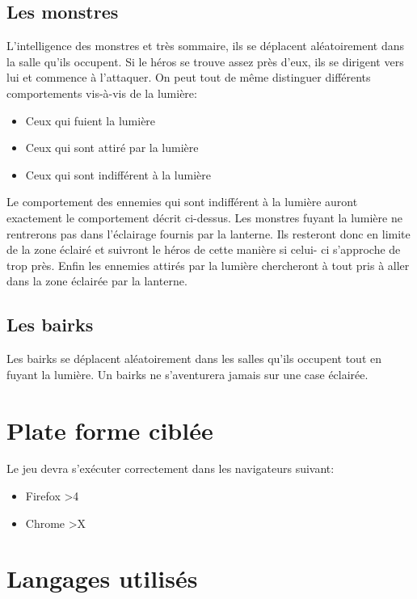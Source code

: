 \documentclass[a4paper, 11pt]{report}
\begin{document}
      \section{Les monstres}
        L'intelligence des monstres et très sommaire, ils se déplacent aléatoirement dans la salle qu'ils 
        occupent. Si le héros se trouve assez près d'eux, ils se dirigent vers lui et commence à l'attaquer.
        On peut tout de m\^eme distinguer différents comportements vis-à-vis de la lumière:
        \begin{itemize}
        \item{Ceux qui fuient la lumière}
        \item{Ceux qui sont attiré par la lumière}
        \item{Ceux qui sont indifférent à la lumière}
        \end{itemize}
        Le comportement des ennemies qui sont indifférent à la lumière auront exactement le comportement
        décrit ci-dessus. Les monstres fuyant la lumière ne rentrerons pas dans l'éclairage fournis par la 
        lanterne. Ils resteront donc en limite de la zone éclairé et suivront le héros de cette manière si celui-
        ci s'approche de trop près. Enfin les ennemies attirés par la lumière chercheront à tout pris à aller 
        dans la zone éclairée par la lanterne.
        
      \section{Les bairks}
        Les bairks se déplacent aléatoirement dans les salles qu'ils occupent tout en fuyant la lumière. Un
        bairks ne s'aventurera jamais sur une case éclairée.

    \chapter{Plate forme ciblée}
      Le jeu devra s'exécuter correctement dans les navigateurs suivant:
      \begin{itemize}
      \item{Firefox >4}
      \item{Chrome >X}
      
      \end{itemize}

    \chapter{Langages utilisés}
\end{document}
